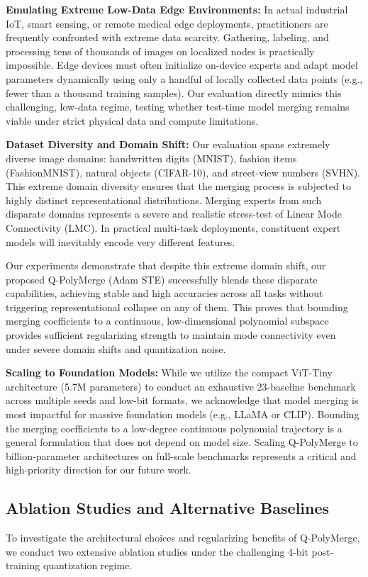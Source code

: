 \textbf{Emulating Extreme Low-Data Edge Environments:} In actual industrial IoT, smart sensing, or remote medical edge deployments, practitioners are frequently confronted with extreme data scarcity. Gathering, labeling, and processing tens of thousands of images on localized nodes is practically impossible. Edge devices must often initialize on-device experts and adapt model parameters dynamically using only a handful of locally collected data points (e.g., fewer than a thousand training samples). Our evaluation directly mimics this challenging, low-data regime, testing whether test-time model merging remains viable under strict physical data and compute limitations.

\textbf{Dataset Diversity and Domain Shift:} Our evaluation spans extremely diverse image domains: handwritten digits (MNIST), fashion items (FashionMNIST), natural objects (CIFAR-10), and street-view numbers (SVHN). This extreme domain diversity ensures that the merging process is subjected to highly distinct representational distributions. Merging experts from such disparate domains represents a severe and realistic stress-test of Linear Mode Connectivity (LMC). In practical multi-task deployments, constituent expert models will inevitably encode very different features. 

Our experiments demonstrate that despite this extreme domain shift, our proposed Q-PolyMerge (Adam STE) successfully blends these disparate capabilities, achieving stable and high accuracies across all tasks without triggering representational collapse on any of them. This proves that bounding merging coefficients to a continuous, low-dimensional polynomial subspace provides sufficient regularizing strength to maintain mode connectivity even under severe domain shifts and quantization noise.

\textbf{Scaling to Foundation Models:} While we utilize the compact ViT-Tiny architecture (5.7M parameters) to conduct an exhaustive 23-baseline benchmark across multiple seeds and low-bit formats, we acknowledge that model merging is most impactful for massive foundation models (e.g., LLaMA or CLIP). Bounding the merging coefficients to a low-degree continuous polynomial trajectory is a general formulation that does not depend on model size. Scaling Q-PolyMerge to billion-parameter architectures on full-scale benchmarks represents a critical and high-priority direction for our future work.

\subsection{Ablation Studies and Alternative Baselines}
To investigate the architectural choices and regularizing benefits of Q-PolyMerge, we conduct two extensive ablation studies under the challenging 4-bit post-training quantization regime.

